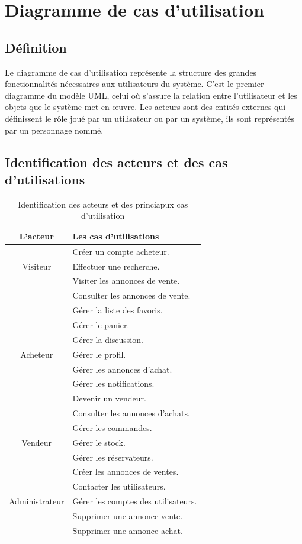 \documentclass[edit,12pt,a4paper,ChapStyle,oneside,doubleinterligne]{report}
\begin{document}
\section{Diagramme de cas d'utilisation}
\subsection{Définition}
Le diagramme de cas d’utilisation représente la structure des grandes fonctionnalités
nécessaires aux utilisateurs du système. C’est le premier diagramme du modèle UML,
celui où s’assure la relation entre l’utilisateur et les objets que le système met en œuvre.
Les acteurs sont des entités externes qui définissent le rôle joué par un utilisateur ou par
un système, ils sont représentés par un personnage nommé\cite{usecas}. 
\subsection{Identification des acteurs et des cas d'utilisations}
\begin{table}[h!]
    \centering
    \begin{tabular}{|c|l|}
    \hline
        L’acteur    & Les cas d’utilisations\\ \hline
                    & Créer un compte acheteur. \\
        Visiteur    & Effectuer une recherche.\\
                    & Visiter les annonces de vente.\\ \hline
                    & Consulter les annonces de vente.\\
                    & Gérer la liste des favoris.\\
                    & Gérer le panier.\\
                    & Gérer la discussion.\\
        Acheteur    & Gérer le profil.\\
                    & Gérer les annonces d'achat.\\
                    & Gérer les notifications.\\
                    & Devenir un vendeur.\\ \hline
                    & Consulter les annonces d'achats.\\
                    & Gérer les commandes.\\
        Vendeur     & Gérer le stock.\\
                    & Gérer les réservateurs.\\
                    & Créer les annonces de ventes. \\ \hline
                    & Contacter les utilisateurs.\\
    Administrateur  & Gérer les comptes des utilisateurs.\\
                    & Supprimer une annonce vente. \\
                    & Supprimer une annonce achat.   \\\hline
    \end{tabular}
    \caption{Identification des acteurs et des princiapux cas d'utilisation}
    \label{tab:Identification des cas d’utilisations}
\end{table}
\end{document}

